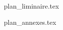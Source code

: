 \documentclass[%
    a4paper,
    11pt,
    toc=listof,
    chapterprefix=on,
    footnotes=multiple,
    DIV=12
]{scrbook}
\begin{document}



\frontmatter
{plan_liminaire.tex}

\mainmatter

\appendix
{}
{plan_annexes.tex}
\end{document}
